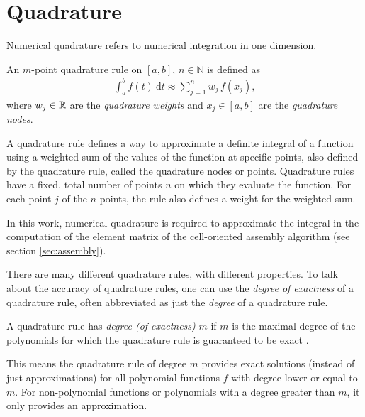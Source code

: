 
\section{Quadrature}

\label{sec:quadrature}

Numerical quadrature refers to numerical integration in one dimension.

\begin{definition}
    An $m$-point quadrature rule on $[a,b]$, $n \in \mathbb{N}$ is defined as \cite{hiptmair_numerical_2023}
    \begin{align}
        \int_a^b f(t) \ \mathrm{d}t \approx \sum_{j=1}^n w_j \, f(x_j),
    \end{align}
    where $w_j \in \mathbb{R}$ are the \emph{quadrature weights} and $x_j \in [a, b]$ are the \emph{quadrature nodes}.
\end{definition}

A quadrature rule defines a way to approximate a definite integral of a function using a weighted sum of the values of the function at specific points, also defined by the quadrature rule, called the quadrature nodes or points.
Quadrature rules have a fixed, total number of points $n$ on which they evaluate the function. For each point $j$ of the $n$ points, the rule also defines a weight for the weighted sum.

In this work, numerical quadrature is required to approximate the integral in the computation of the element matrix of the cell-oriented assembly algorithm (see section \ref{sec:assembly}).

There are many different quadrature rules, with different properties.
To talk about the accuracy of quadrature rules, one can use the \emph{degree of exactness} of a quadrature rule, often abbreviated as just the \emph{degree} of a quadrature rule.

\begin{definition}
    A quadrature rule has \emph{degree (of exactness)} $m$ if $m$ is the maximal degree of the polynomials
    for which the quadrature rule is guaranteed to be exact \cite[Def.~7.4.1.1]{hiptmair_numerical_2020}.
\end{definition}

This means the quadrature rule of degree $m$ provides exact solutions (instead of just approximations)
for all polynomial functions $f$ with degree lower or equal to $m$. For non-polynomial functions or
polynomials with a degree greater than $m$, it only provides an approximation.

